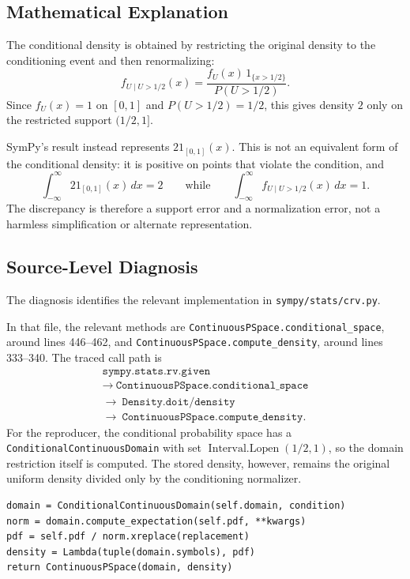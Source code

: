 \documentclass[11pt]{article}
\begin{document}
\subsection{Mathematical Explanation}

The conditional density is obtained by restricting the original density to the
conditioning event and then renormalizing:
\[
f_{U \mid U>1/2}(x)
  = \frac{f_U(x)\,\mathrm{1}_{\{x>1/2\}}}{P(U>1/2)}.
\]
Since \(f_U(x)=1\) on \([0,1]\) and \(P(U>1/2)=1/2\), this gives density \(2\)
only on the restricted support \((1/2,1]\).

SymPy's result instead represents \(2\mathrm{1}_{[0,1]}(x)\).  This is not an
equivalent form of the conditional density: it is positive on points that
violate the condition, and
\[
\int_{-\infty}^{\infty} 2\mathrm{1}_{[0,1]}(x)\,dx = 2
\qquad\text{while}\qquad
\int_{-\infty}^{\infty} f_{U \mid U>1/2}(x)\,dx = 1.
\]
The discrepancy is therefore a support error and a normalization error, not a
harmless simplification or alternate representation.

\subsection{Source-Level Diagnosis}

The diagnosis identifies the relevant implementation in
\nolinkurl{sympy/stats/crv.py}.

In that file, the relevant methods are
\nolinkurl{ContinuousPSpace.conditional_space}, around lines 446--462, and
\nolinkurl{ContinuousPSpace.compute_density}, around lines 333--340.
The traced call path is
\[
\begin{array}{c}
\texttt{sympy.stats.rv.given} \\
\rightarrow\ \texttt{ContinuousPSpace.conditional\_space} \\
\rightarrow\ \texttt{Density.doit}/\texttt{density} \\
\rightarrow\ \texttt{ContinuousPSpace.compute\_density}.
\end{array}
\]
For the reproducer, the conditional probability space has a
\texttt{ConditionalContinuousDomain} with set
\(\operatorname{Interval.Lopen}(1/2,1)\), so the domain restriction itself is
computed.  The stored density, however, remains the original uniform density
divided only by the conditioning normalizer.

\begin{lstlisting}[style=bugpython]
domain = ConditionalContinuousDomain(self.domain, condition)
norm = domain.compute_expectation(self.pdf, **kwargs)
pdf = self.pdf / norm.xreplace(replacement)
density = Lambda(tuple(domain.symbols), pdf)
return ContinuousPSpace(domain, density)
\end{lstlisting}
\end{document}
